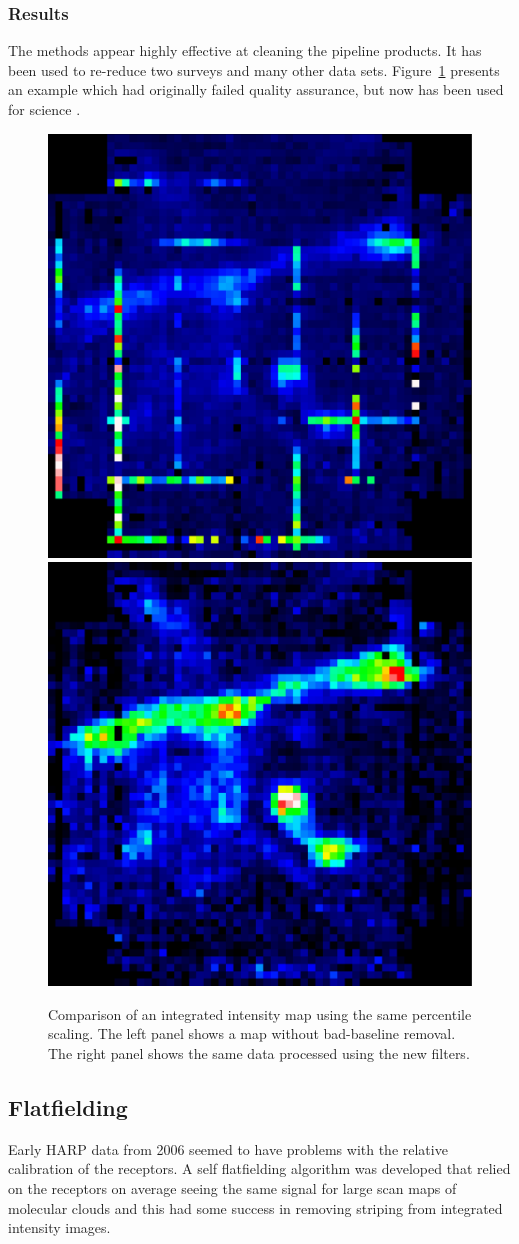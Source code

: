 \documentclass[final,authoryear,5p,times,twocolumn]{elsarticle}
\begin{document}
\subsubsection{Results}

The methods appear highly effective at cleaning the pipeline
products. It has been used to re-reduce two surveys and many other
data sets. Figure~\ref{fig:badbase:results} presents an example which
had originally failed quality assurance, but now has been used for
science \cite{2013ApJ...767..126S}.

\begin{figure}
\includegraphics[width=0.495\columnwidth]{P61_f3a}
\includegraphics[width=0.495\columnwidth]{P61_f3b}
\caption{Comparison of an integrated intensity map using the same
  percentile scaling.  The left panel shows a map without bad-baseline
  removal.  The right panel shows the same data processed using the
  new filters.}
\label{fig:badbase:results}
\end{figure}

\subsection{Flatfielding}

Early HARP data from 2006 seemed to have problems with the relative
calibration of the receptors. A self flatfielding algorithm was
developed that relied on the receptors on average seeing the same
signal for large scan maps of molecular clouds
\citep{2010MNRAS.401..455C} and this had some success in removing
striping from integrated intensity images.
\end{document}
